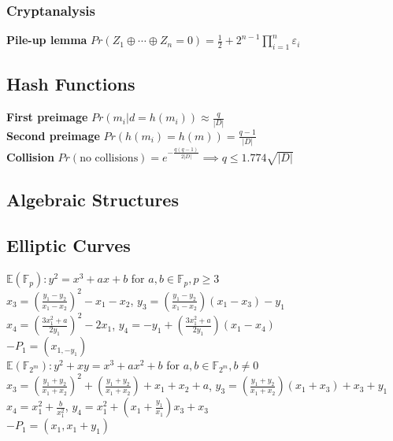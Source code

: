 \documentclass[twoside, 11pt]{article}
\begin{document}
            \subsubsection*{Cryptanalysis}
                \textbf{Pile-up lemma} $Pr(Z_{1} \oplus \cdots \oplus Z_{n} = 0) = \frac{1}{2} + 2^{n-1}\prod_{i=1}^{n}\varepsilon_{i}$ \\


        \subsection*{Hash Functions}
            \textbf{First preimage} $Pr(m_{i} | d=h(m_{i})) \approx \frac{q}{|D|}$ \\
            \textbf{Second preimage} $Pr(h(m_{i}) = h(m)) = \frac{q-1}{|D|}$ \\
            \textbf{Collision} $Pr(\text{no collisions}) = e^{-\frac{q(q-1)}{2|D|}} \implies q \leqslant 1.774\sqrt{|D|}$

        \subsection*{Algebraic Structures}

        \subsection*{Elliptic Curves}
            $\mathds{E}(\mathds{F}_{p}): y^{2} = x^{3} + ax + b$ for $a, b \in \mathds{F}_{p}, p \ge 3$ \\
            $x_{3}=(\frac{y_{1}- y_{2}}{x_{1}-x_{2}})^{2} - x_{1} - x_{2}$, $y_{3} = (\frac{y_{1}-y_{2}}{x_{1}-x_{2}})(x_{1}-x_{3})-y_{1}$ \\
            $x_{4}=(\frac{3x_{1}^{2}+a}{2y_{1}})^{2}-2x_{1}$, $y_{4} = -y_{1}+(\frac{3x_{1}^{2}+a}{2y_{1}})(x_{1}-x_{4})$ \\
            $-P_{1} = (x_{1, -y_{1}})$ \\
            $\mathds{E}(\mathds{F}_{2^{m}}) : y^{2} + xy = x^{3} + ax^{2} + b$ for $a, b \in \mathds{F}_{2^{m}}, b\neq 0$ \\
            $x_{3}= (\frac{y_{1}+y_{2}}{x_{1}+x_{2}})^{2} + (\frac{y_{1}+y_{2}}{x_{1}+x_{2}}) + x_{1} + x_{2} + a$, $y_{3} = (\frac{y_{1}+y_{2}}{x_{1}+x_{2}})(x_{1}+ x_{3})+x_{3}+ y_{1}$ \\
            $x_{4} = x_{1}^{2}+\frac{b}{x_{1}^{2}}$, $y_{4}=x_{1}^{2}+(x_{1}+ \frac{y_{1}}{x_{1}})x_{3} + x_{3}$ \\
            $-P_{1} = (x_{1}, x_{1}+ y_{1})$\\
\end{document}
